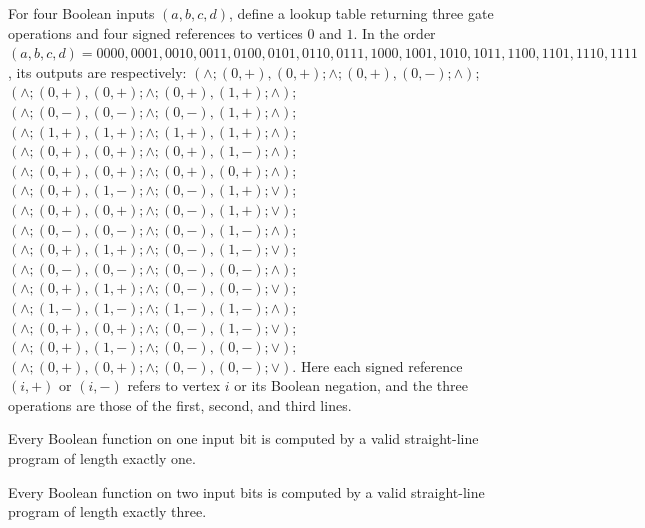 \begin{definition}
\label{BoolCircuit.table2}
\leanok
{}
For four Boolean inputs $(a,b,c,d)$, define a lookup table returning three gate
operations and four signed references to vertices $0$ and $1$. In the order
$(a,b,c,d)=0000,0001,0010,0011,0100,0101,0110,0111,1000,1001,1010,1011,1100,1101,1110,1111$,
its outputs are respectively: $(\land;(0,+),(0,+);\land;(0,+),(0,-);\land)$;
$(\land;(0,+),(0,+);\land;(0,+),(1,+);\land)$;
$(\land;(0,-),(0,-);\land;(0,-),(1,+);\land)$;
$(\land;(1,+),(1,+);\land;(1,+),(1,+);\land)$;
$(\land;(0,+),(0,+);\land;(0,+),(1,-);\land)$;
$(\land;(0,+),(0,+);\land;(0,+),(0,+);\land)$;
$(\land;(0,+),(1,-);\land;(0,-),(1,+);\lor)$;
$(\land;(0,+),(0,+);\land;(0,-),(1,+);\lor)$;
$(\land;(0,-),(0,-);\land;(0,-),(1,-);\land)$;
$(\land;(0,+),(1,+);\land;(0,-),(1,-);\lor)$;
$(\land;(0,-),(0,-);\land;(0,-),(0,-);\land)$;
$(\land;(0,+),(1,+);\land;(0,-),(0,-);\lor)$;
$(\land;(1,-),(1,-);\land;(1,-),(1,-);\land)$;
$(\land;(0,+),(0,+);\land;(0,-),(1,-);\lor)$;
$(\land;(0,+),(1,-);\land;(0,-),(0,-);\lor)$;
$(\land;(0,+),(0,+);\land;(0,-),(0,-);\lor)$. Here each signed reference $(i,+)$ or
$(i,-)$ refers to vertex $i$ or its Boolean negation, and the three operations are those
of the first, second, and third lines.
\end{definition}

\begin{theorem}
\label{BoolCircuit.exists_oneLine}
\leanok
{}
Every Boolean function on one input bit is computed by a valid straight-line program of
length exactly one.
\end{theorem}

\begin{theorem}
\label{BoolCircuit.exists_threeLine}
\leanok
{}
Every Boolean function on two input bits is computed by a valid straight-line program of
length exactly three.
\end{theorem}

